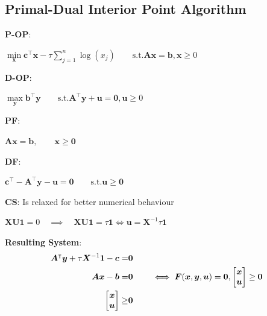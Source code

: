 \documentclass[english]{latex4ei/latex4ei_sheet}
\begin{document}
\begin{sectionbox}
	\subsection{Primal-Dual Interior Point Algorithm}
	\vspace{0.5em}
	\textbf{P-OP}: \\
	\begin{center}
		$\min\limits_{\bm{x}} \bm{c}^\intercal\bm{x} - \tau \sum\limits_{j=1}^{n} \log(x_j) \qquad \text{s.t.} \bm{A}\bm{x} = \bm{b}, \bm{x} \geq 0$
	\end{center}
	\vspace{0.5em}
	
	\textbf{D-OP}: \\
	\begin{center}
		$\max\limits_{\bm{y}} \bm{b}^\intercal\bm{y} \qquad \text{s.t.} \bm{A}^\intercal\bm{y} + \bm{u} = \bm{0}, \bm{u} \geq 0$
	\end{center}
	\vspace{0.5em}
	
	\textbf{PF}:
	\begin{center}
		$\bm{A}\bm{x} = \bm{b}, \qquad \bm{x} \geq \bm{0}$
	\end{center}
	\vspace{0.5em}
	
	\textbf{DF}:
	\begin{center}
		$\bm{c}^\intercal - \bm{A}^\intercal\bm{y} - \bm{u} = \bm{0} \qquad \text{s.t.} \bm{u} \geq \bm{0} $
	\end{center}
	\vspace{0.5em}

	\textbf{CS}: Is relaxed for better numerical behaviour
	\begin{center}
		$\bm{X}\bm{U}\mathbf{1} = 0 \quad \implies \quad \bm{X}\bm{U}\mathbf{1} = \tau\mathbf{1} \iff \bm{u} = \bm{X}^{-1}\tau\mathbf{1}$
	\end{center}
	\vspace{0.5em}
	
	\textbf{Resulting System}:
	\begin{align}
		\bm{A}^\intercal\bm{y} + \tau \bm{X}^{-1}\mathbf{1} - \bm{c} = & \bm{0} \notag\\
		\bm{A}\bm{x} - \bm{b} = & \bm{0} \qquad \iff \bm{F}(\bm{x}, \bm{y}, \bm{u}) = \bm{0}, \begin{bmatrix}
			\bm{x} \\
			\bm{u}
		\end{bmatrix} \geq \bm{0} \notag\\
		\begin{bmatrix}
			\bm{x} \\
			\bm{u}
		\end{bmatrix} \geq & \bm{0} \notag
	\end{align}
	\vspace{0.5em}
	

\end{sectionbox}
\end{document}
